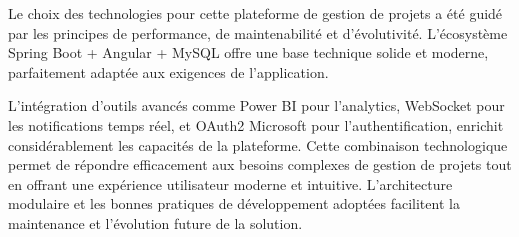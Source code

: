 Le choix des technologies pour cette plateforme de gestion de projets a été guidé par les principes de performance, de maintenabilité et d'évolutivité. L'écosystème Spring Boot + Angular + MySQL offre une base technique solide et moderne, parfaitement adaptée aux exigences de l'application.

L'intégration d'outils avancés comme Power BI pour l'analytics, WebSocket pour les notifications temps réel, et OAuth2 Microsoft pour l'authentification, enrichit considérablement les capacités de la plateforme. Cette combinaison technologique permet de répondre efficacement aux besoins complexes de gestion de projets tout en offrant une expérience utilisateur moderne et intuitive. L'architecture modulaire et les bonnes pratiques de développement adoptées facilitent la maintenance et l'évolution future de la solution. 